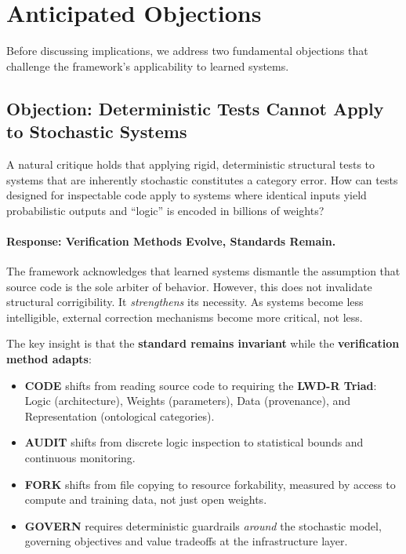 \documentclass[11pt,a4paper]{article}
\theoremstyle{definition}
\begin{document}
\section{Anticipated Objections}
\label{sec:objections}

Before discussing implications, we address two fundamental objections that challenge the framework's applicability to learned systems.

\subsection{Objection: Deterministic Tests Cannot Apply to Stochastic Systems}

A natural critique holds that applying rigid, deterministic structural tests to systems that are inherently stochastic constitutes a category error. How can tests designed for inspectable code apply to systems where identical inputs yield probabilistic outputs and ``logic'' is encoded in billions of weights?

\paragraph{Response: Verification Methods Evolve, Standards Remain.} The framework acknowledges that learned systems dismantle the assumption that source code is the sole arbiter of behavior. However, this does not invalidate structural corrigibility. It \textit{strengthens} its necessity. As systems become less intelligible, external correction mechanisms become more critical, not less.

The key insight is that the \textbf{standard remains invariant} while the \textbf{verification method adapts}:

\begin{itemize}[noitemsep]
    \item \textbf{CODE} shifts from reading source code to requiring the \textbf{LWD-R Triad}: Logic (architecture), Weights (parameters), Data (provenance), and Representation (ontological categories).
    \item \textbf{AUDIT} shifts from discrete logic inspection to statistical bounds and continuous monitoring.
    \item \textbf{FORK} shifts from file copying to resource forkability, measured by access to compute and training data, not just open weights.
    \item \textbf{GOVERN} requires deterministic guardrails \textit{around} the stochastic model, governing objectives and value tradeoffs at the infrastructure layer.
\end{itemize}
\end{document}
